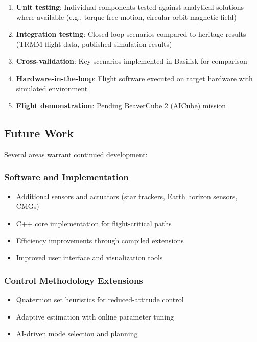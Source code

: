 \documentclass[conference]{IEEEtran}
\begin{document}
\begin{enumerate}
    \item \textbf{Unit testing}: Individual components tested against analytical solutions where available (e.g., torque-free motion, circular orbit magnetic field)
    \item \textbf{Integration testing}: Closed-loop scenarios compared to heritage results (TRMM flight data, published simulation results)
    \item \textbf{Cross-validation}: Key scenarios implemented in Basilisk for comparison
    \item \textbf{Hardware-in-the-loop}: Flight software executed on target hardware with simulated environment
    \item \textbf{Flight demonstration}: Pending BeaverCube 2 (AICube) mission
\end{enumerate}


\subsection{Future Work}\label{subsec:future_work}

Several areas warrant continued development:

\subsubsection{Software and Implementation}
\begin{itemize}
    \item Additional sensors and actuators (star trackers, Earth horizon sensors, CMGs)
    \item C++ core implementation for flight-critical paths
    \item Efficiency improvements through compiled extensions
    \item Improved user interface and visualization tools
\end{itemize}

\subsubsection{Control Methodology Extensions}
\begin{itemize}
    \item Quaternion set heuristics for reduced-attitude control
    \item Adaptive estimation with online parameter tuning
    \item AI-driven mode selection and planning
\end{itemize}
\end{document}
